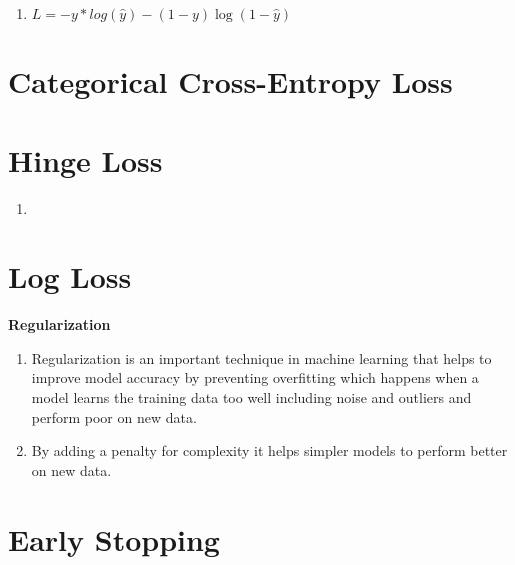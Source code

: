 \begin{enumerate}
    \item[]
    $
        L = -y * log(\hat{y}) - (1 - y)  \log(1 - \hat{y})
    $
    \hfill \cite{datacamp/tutorial/loss-function-in-machine-learning}
\end{enumerate}

\section{Categorical Cross-Entropy Loss}

\section{Hinge Loss}

\begin{enumerate}
    \item 
\end{enumerate}


\section{Log Loss}




\clearpage
{\centering\fontsize{22}{22}\selectfont\bfseries Regularization \par}
\vspace{0.5cm}


\begin{enumerate}
    \item Regularization is an important technique in machine learning that helps to improve model accuracy by preventing overfitting which happens when a model learns the training data too well including noise and outliers and perform poor on new data. 
    \hfill \cite{geeksforgeeks/machine-learning/regularization-in-machine-learning}
    
    \item By adding a penalty for complexity it helps simpler models to perform better on new data.
    \hfill \cite{geeksforgeeks/machine-learning/regularization-in-machine-learning}
\end{enumerate}




\section{Early Stopping}

